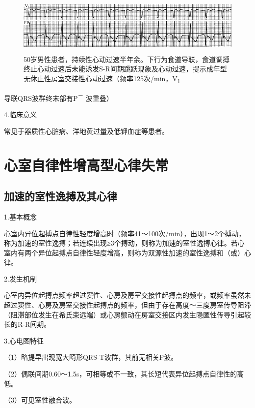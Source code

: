\begin{figure}[!htbp]
 \centering
 \includegraphics[width=5.58333in,height=1.13542in]{./images/Image00273.jpg}
 \captionsetup{justification=centering}
 \caption{50岁男性患者，持续性心动过速半年余。下行为食道导联，食道调搏终止心动过速后未能诱发S-R间期跳跃现象及心动过速，提示成年型无休止性房室交接性心动过速（频率125次/min，V\textsubscript{1}}
 \label{fig15-7}
  \end{figure} 
导联QRS波群终末部有P\textsuperscript{－} 波重叠）

4.临床意义

常见于器质性心脏病、洋地黄过量及低钾血症等患者。

\protect\hypertarget{text00022.htmlux5cux23subid270}{}{}

\section{心室自律性增高型心律失常}

\protect\hypertarget{text00022.htmlux5cux23subid271}{}{}

\subsection{加速的室性逸搏及其心律}

1.基本概念

心室内异位起搏点自律性轻度增高时（频率41～100次/min），出现1～2个搏动，称为加速的室性逸搏；若连续出现≥3个搏动，则称为加速的室性逸搏心律。若心室内有两个异位起搏点自律性轻度增高，则称为双源性加速的室性逸搏和（或）心律。

2.发生机制

心室内异位起搏点频率超过窦性、心房及房室交接性起搏点的频率，或频率虽然未超过窦性、心房及房室交接性起搏点的频率，但由于存在高度～三度房室传导阻滞（阻滞部位发生在希氏束远端）或心房颤动在房室交接区内发生隐匿性传导引起较长的R-R间期。

3.心电图特征

（1）略提早出现宽大畸形QRS-T波群，其前无相关P波。

（2）偶联间期0.60～1.5s，可相等或不一致，其长短代表异位起搏点自律性的高低。

（3）可见室性融合波。

